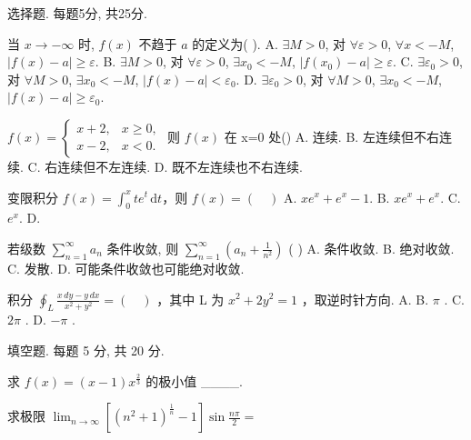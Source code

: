 \par{}
选择题. 每题5分, 共25分.\par
当 $x \to -\infty$ 时, $f(x)$ 不趋于 $a$ 的定义为( ).  
A. $\exists M > 0$, 对 $\forall \varepsilon > 0$, $\forall x < -M$, $|f(x) - a| \geq \varepsilon$.  
B. $\exists M > 0$, 对 $\forall \varepsilon > 0$, $\exists x_0 < -M$, $|f(x_0) - a| \geq \varepsilon$.  
C. $\exists \varepsilon_0 > 0$, 对 $\forall M > 0$, $\exists x_0 < -M$, $|f(x) - a| < \varepsilon_0$.  
D. $\exists \varepsilon_0 > 0$, 对 $\forall M > 0$, $\exists x_0 < -M$, $|f(x) - a| \geq \varepsilon_0$.\par
$f(x)=\left\{\begin{aligned}x+2,&x\geq0,\\ x-2,&x<0.\end{aligned}\right.$  则  $f(x)$  在 x=0 处() A. 连续. B. 左连续但不右连续. C. 右连续但不左连续. D. 既不左连续也不右连续.\par
变限积分 $f(x) = \int_{0}^{x} te^{t} \, \mathrm{d}t$，则 $f(x) = (\quad)$ A. $xe^{x} + e^{x} - 1$. B. $xe^{x} + e^{x}$. C. $e^{x}$. D.
\par
若级数  $\sum_{n=1}^{\infty}a_{n}$  条件收敛, 则  $\sum_{n=1}^{\infty}\left(a_{n}+\frac{1}{n^{2}}\right)$  ( )
A. 条件收敛. B. 绝对收敛. C. 发散. D. 可能条件收敛也可能绝对收敛.\par
积分  $\oint_{L}\frac{x\,dy-y\,dx}{x^{2}+y^{2}}=(\quad)$ ，其中 L 为  $x^{2}+2y^{2}=1$ ，取逆时针方向.
A.
B.  $\pi$ . C.  $2\pi$ . D.  $-\pi$ .\par
\par{}
填空题. 每题 5 分, 共 20 分.\par
求  $f(x)=(x-1)x^{\frac{2}{3}}$  的极小值 \_\_\_\_.\par
求极限 $\lim_{n\to \infty}\left[(n^2 +1)^{\frac{1}{n}} - 1\right]\sin \frac{n\pi}{2} =$\par
